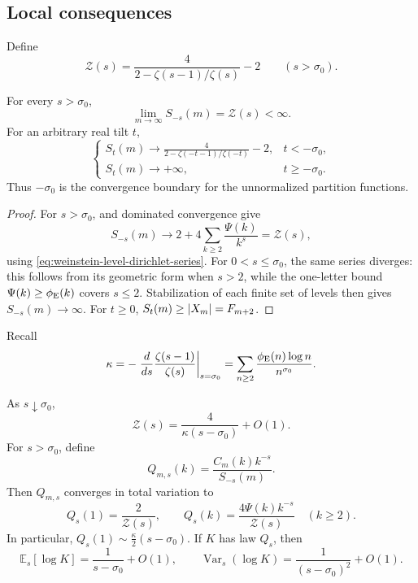 \ifdefined\supplementonly
\else
\subsection{Local consequences}

Define
\[
 \mathcal Z(s)=\frac4{2-\zeta(s-1)/\zeta(s)}-2
 \qquad(s>\sigma_0).
\]

\begin{corollary}
\label{thm:spectral-partition-function}
For every \(s>\sigma_0\),
\[
 \lim_{m\to\infty}S_{-s}(m)=\mathcal Z(s)<\infty.
\]
For an arbitrary real tilt \(t\),
\[
 \begin{cases}
 S_t(m)\longrightarrow
 \displaystyle\frac4{2-\zeta(-t-1)/\zeta(-t)}-2,&t< -\sigma_0,\\[8pt]
 S_t(m)\longrightarrow+\infty,&t\ge-\sigma_0.
 \end{cases}
\]
Thus \(-\sigma_0\) is the convergence boundary for the unnormalized
partition functions.
\end{corollary}

\begin{proof}
For \(s>\sigma_0\),  and dominated
convergence give
\[
 S_{-s}(m)\longrightarrow
 2+4\sum_{k\ge2}\frac{\Psi(k)}{k^s}=\mathcal Z(s),
\]
using \eqref{eq:weinstein-level-dirichlet-series}.  For
\(0<s\le\sigma_0\), the same series diverges: this follows from its
geometric form when \(s>2\), while the one-letter bound
\(\Psi(k)\ge\phi_{\rm E}(k)\) covers \(s\le2\).  Stabilization of each
finite set of levels then gives \(S_{-s}(m)\to\infty\).  For \(t\ge0\),
\(S_t(m)\ge\lvert X_m \rvert=F_{m+2}\).
\end{proof}

Recall
\[
 \kappa=-\left.\frac{d}{ds}\frac{\zeta(s-1)}{\zeta(s)}
          \right|_{s=\sigma_0}
 =\sum_{n\ge2}\frac{\phi_{\rm E}(n)\log n}{n^{\sigma_0}}.
\]

\begin{corollary}
\label{thm:critical-gibbs-spectrum}
As \(s\downarrow\sigma_0\),
\[
 \mathcal Z(s)=\frac4{\kappa(s-\sigma_0)}+O(1).
\]
For \(s>\sigma_0\), define
\[
 Q_{m,s}(k)=\frac{C_m(k)k^{-s}}{S_{-s}(m)}.
\]
Then \(Q_{m,s}\) converges in total variation to
\[
 Q_s(1)=\frac2{\mathcal Z(s)},
 \qquad Q_s(k)=\frac{4\Psi(k)k^{-s}}{\mathcal Z(s)}\quad(k\ge2).
\]
In particular, \(Q_s(1)\sim\frac\kappa2(s-\sigma_0)\).  If \(K\) has law
\(Q_s\), then
\[
 \mathbb E_s[\log K]=\frac1{s-\sigma_0}+O(1),
 \qquad
 \operatorname{Var}_s(\log K)=\frac1{(s-\sigma_0)^2}+O(1).
\]
\end{corollary}

